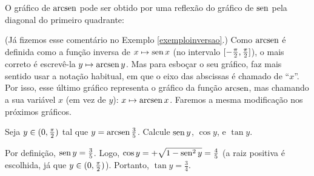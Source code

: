  O gráfico de $\operatorname{arcsen}$ pode ser obtido por uma reflexão do gráfico de $\operatorname{sen}$ pela
diagonal do primeiro quadrante:
\begin{center}
\begin{bmlimage}\end{bmlimage}
\end{center}
\begin{obs} (Já fizemos esse comentário no Exemplo \ref{exemploinversao}.)
 Como $\operatorname{arcsen}$ é definida como a função inversa de $x\mapsto \operatorname{sen} x$ (no intervalo
$[-\tfrac{\pi}{2}, \tfrac{\pi}{2}]$), o mais correto é escrevê-la $y\mapsto \operatorname{arcsen} y$.
 Mas para esboçar o seu gráfico, faz mais sentido usar a notação habitual, em que o eixo
das abscissas é chamado de ``$x$''. Por isso, esse último gráfico representa o gráfico da
função $\operatorname{arcsen}$, mas chamando a sua variável $x$ (em vez de $y$): 
$x\mapsto \operatorname{arcsen} x$.
Faremos a mesma modificação nos próximos gráficos.
\end{obs}

\begin{exo}
Seja $y\in (0,\tfrac{\pi}{2})$ tal que $y=\operatorname{arcsen}\tfrac35$. Calcule $\operatorname{sen} y$, $\cos y$, e
$\tan y$.
\begin{sol}
Por definição, $\operatorname{sen} y=\tfrac35$. Logo, $\cos y=+\sqrt{1-\operatorname{sen}^2 y}=\tfrac45$ (a raiz
positiva é escolhida, já que $y\in (0,\tfrac{\pi}{2})$). Portanto, $\tan y=\tfrac34$.
\end{sol}
\end{exo}

